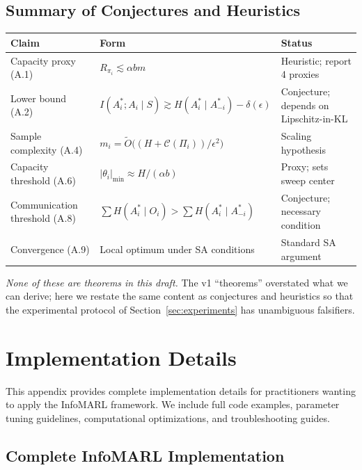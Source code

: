 \documentclass[10pt, letterpaper]{article}
\begin{document}
\subsection{Summary of Conjectures and Heuristics}

\begin{center}
\small
\begin{tabular}{lll}
\toprule
\textbf{Claim} & \textbf{Form} & \textbf{Status} \\
\midrule
Capacity proxy (A.1) & $R_{\pi_i} \lesssim \alpha b m$ & Heuristic; report 4 proxies \\
Lower bound (A.2) & $I(A_i^*; A_i\mid S) \gtrsim H(A_i^*\mid A_{-i}^*) - \delta(\epsilon)$ & Conjecture; depends on Lipschitz-in-KL \\
Sample complexity (A.4) & $m_i = \tilde{O}\bigl((H + \mathcal{C}(\Pi_i))/\epsilon^2\bigr)$ & Scaling hypothesis \\
Capacity threshold (A.6) & $|\theta_i|_\text{min} \approx H/(\alpha b)$ & Proxy; sets sweep center \\
Communication threshold (A.8) & $\sum H(A_i^*\mid O_i) > \sum H(A_i^*\mid A_{-i}^*)$ & Conjecture; necessary condition \\
Convergence (A.9) & Local optimum under SA conditions & Standard SA argument \\
\bottomrule
\end{tabular}
\end{center}

\emph{None of these are theorems in this draft.} The v1 ``theorems'' overstated what we can derive; here we restate the same content as conjectures and heuristics so that the experimental protocol of Section~\ref{sec:experiments} has unambiguous falsifiers.

\section{Implementation Details}
\label{app:impl}

This appendix provides complete implementation details for practitioners wanting to apply the InfoMARL framework. We include full code examples, parameter tuning guidelines, computational optimizations, and troubleshooting guides.

\subsection{Complete InfoMARL Implementation}
\end{document}
